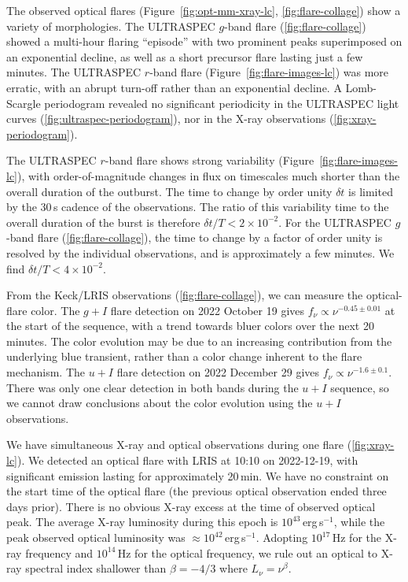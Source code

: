\documentclass{nature_plusfigure}
\begin{document}
\begin{methods}
The observed optical flares (Figure~\ref{fig:opt-mm-xray-lc}, \ref{fig:flare-collage}) show a variety of morphologies. The ULTRASPEC $g$-band flare (\ref{fig:flare-collage}) showed a multi-hour flaring ``episode'' with two prominent peaks superimposed on an exponential decline, as well as a short precursor flare lasting just a few minutes. The ULTRASPEC $r$-band flare (Figure~\ref{fig:flare-images-lc}) was more erratic, with an abrupt turn-off rather than an exponential decline. A Lomb-Scargle periodogram\cite{Lomb1976,Scargle1982} revealed no significant periodicity in the ULTRASPEC light curves (\ref{fig:ultraspec-periodogram}), nor in the X-ray observations (\ref{fig:xray-periodogram}). %

The ULTRASPEC $r$-band flare shows strong variability (Figure~\ref{fig:flare-images-lc}), with order-of-magnitude changes in flux on timescales much shorter than the overall duration of the outburst. The time to change by order unity $\delta t$ is limited by the 30\,s cadence of the observations. The ratio of this variability time to the overall duration of the burst is therefore $\delta t/T<2\times10^{-2}$. For the ULTRASPEC $g$-band flare (\ref{fig:flare-collage}), the time to change by a factor of order unity is resolved by the individual observations, and is approximately a few minutes. We find $\delta t/T<4\times10^{-2}$.

From the Keck/LRIS observations (\ref{fig:flare-collage}), we can measure the optical-flare color. The $g+I$ flare detection on 2022 October 19 gives $f_\nu \propto \nu^{-0.45\pm0.01}$ at the start of the sequence, with a trend towards bluer colors over the next 20 minutes. The color evolution may be due to an increasing contribution from the underlying blue transient, rather than a color change inherent to the flare mechanism.
The $u+I$ flare detection on 2022 December 29 gives $f_\nu \propto \nu^{-1.6\pm0.1}$. There was only one clear detection in both bands during the $u+I$ sequence, so we cannot draw conclusions about the color evolution using the $u+I$ observations. 

We have simultaneous X-ray and optical observations during one flare (\ref{fig:xray-lc}). We detected an optical flare with LRIS at 10:10 on 2022-12-19, with significant emission lasting for approximately 20\,min. We have no constraint on the start time of the optical flare (the previous optical observation ended three days prior). There is no obvious X-ray excess at the time of observed optical peak. The average X-ray luminosity during this epoch is $10^{43}\,$erg\,s$^{-1}$, while the peak observed optical luminosity was $\approx 10^{42}$\,erg\,s$^{-1}$.
Adopting $10^{17}\,$Hz for the X-ray frequency and $10^{14}\,$Hz for the optical frequency, we rule out an optical to X-ray spectral index shallower than $\beta=-4/3$ where $L_\nu = \nu^{\beta}$. 


\end{methods}
\end{document}
